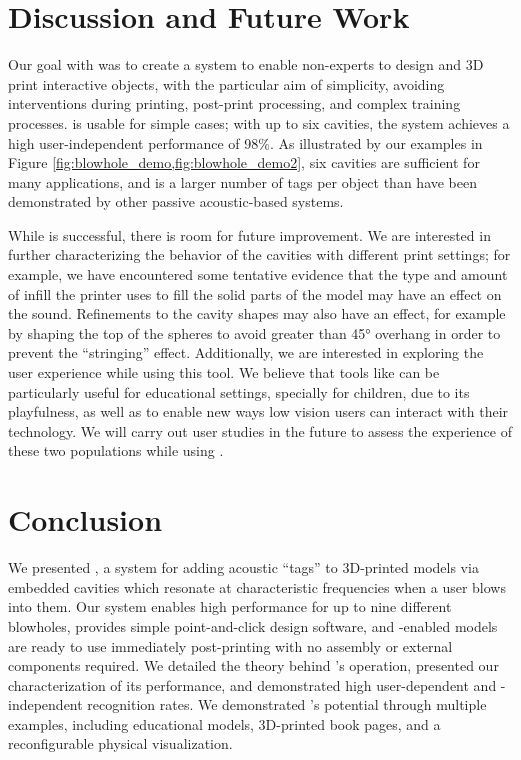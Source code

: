   \section{Discussion and Future Work}
    Our goal with \bh was to create a system to enable non-experts to design and
    3D print interactive objects, with the particular aim of simplicity,
    avoiding interventions during printing, post-print processing, and complex
    training processes. \bh is usable for simple cases; with up to six cavities,
    the system achieves a high user-independent performance of 98\%. As
    illustrated by our examples in Figure \ref{fig:blowhole_demo,fig:blowhole_demo2},
    six cavities are sufficient for many applications, and is a larger number of
    tags per object than have been demonstrated by other passive acoustic-based
    systems\cite{Reyes:2016iy,Li:2016bt,Shi:2016ff,Laput:2015hn,He:2017jc,Harrison:2012kw}.
    
    While \bh is successful, there is room for future improvement. We are
    interested in further characterizing the behavior of the cavities with
    different print settings; for example, we have encountered some tentative
    evidence that the type and amount of infill the printer uses to fill the
    solid parts of the model may have an effect on the sound. Refinements to the
    cavity shapes may also have an effect, for example by shaping the top of the
    spheres to avoid greater than 45° overhang in order to prevent the
    ``stringing'' effect. Additionally, we are interested in exploring the user
    experience while using this tool. We believe that tools like \bh can be
    particularly useful for educational settings, specially for children, due to
    its playfulness, as well as to enable new ways low vision users can interact
    with their technology. We will carry out user studies in the future to
    assess the experience of these two populations while using \bh.
    
  \section{Conclusion}
    We presented \bh, a system for adding acoustic ``tags'' to 3D-printed models
    via embedded cavities which resonate at characteristic frequencies when a
    user blows into them. Our system enables high performance for up to nine
    different blowholes, provides simple point-and-click design software, and
    \bh-enabled models are ready to use immediately post-printing with no
    assembly or external components required. We detailed the theory behind
    \bh's operation, presented our characterization of its performance, and
    demonstrated high user-dependent and -independent recognition rates. We
    demonstrated \bh's potential through multiple examples, including
    educational models, 3D-printed book pages, and a reconfigurable physical
    visualization. 